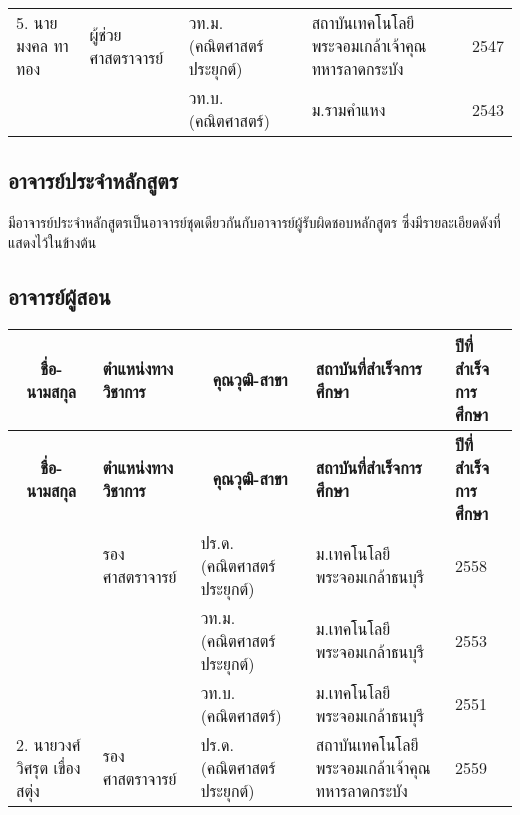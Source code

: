 {\begin{longtable}{|p{}|p{}|p{}|p{}|p{}|}
 \multirow{1}{*}{5. นายมงคล ทาทอง}  & ผู้ช่วยศาสตราจารย์ & วท.ม. (คณิตศาสตร์ประยุกต์) & สถาบันเทคโนโลยีพระจอมเกล้าเจ้าคุณทหารลาดกระบัง & 2547 \\ \cline{3-5} 
             &                   & วท.บ. (คณิตศาสตร์)         & ม.รามคำแหง                   & 2543                \\ \hline
             

\end{longtable}


\subsection*{อาจารย์ประจำหลักสูตร}

\printprogram{} มีอาจารย์ประจำหลักสูตรเป็นอาจารย์ชุดเดียวกันกับอาจารย์ผู้รับผิดชอบหลักสูตร ซึ่งมีรายละเอียดดังที่แสดงไว้ในข้างต้น
\newpage
\subsection*{อาจารย์ผู้สอน}
\begin{center}
	{\footnotesize     
		\begin{longtable}{|p{}|p{}|p{}|p{}|p{}|}
			\hline
			\multicolumn{1}{|c|}{\textbf{ชื่อ-นามสกุล}} & \textbf{ตำแหน่งทางวิชาการ} & \multicolumn{1}{c|}{\textbf{คุณวุฒิ-สาขา}}               & \textbf{สถาบันที่สำเร็จการศึกษา}               & \textbf{ปีที่สำเร็จการศึกษา} \\ \hline
			
			\endfirsthead
			\hline
		\multicolumn{1}{|c|}{\textbf{ชื่อ-นามสกุล}} & \textbf{ตำแหน่งทางวิชาการ} & \multicolumn{1}{c|}{\textbf{คุณวุฒิ-สาขา}}               & \textbf{สถาบันที่สำเร็จการศึกษา}               & \textbf{ปีที่สำเร็จการศึกษา} \\ \hline
				\endhead
				\hline
				\endfoot
			
		\multirow{1}{*}{1. นายพงศกร สุนทรายุทธ์}
				&รองศาสตราจารย์	&ปร.ด. (คณิตศาสตร์ประยุกต์) &ม.เทคโนโลยีพระจอมเกล้าธนบุรี&2558\\
				\cline{3-5}
				&&วท.ม. (คณิตศาสตร์ประยุกต์)&ม.เทคโนโลยีพระจอมเกล้าธนบุรี&2553\\
				\cline{3-5}
				&& วท.บ. (คณิตศาสตร์)&ม.เทคโนโลยีพระจอมเกล้าธนบุรี&2551\\
				\hline
		
		\multirow{1}{*}{2. นายวงศ์วิศรุต เขื่องสตุ่ง}
				&รองศาสตราจารย์&ปร.ด. (คณิตศาสตร์ประยุกต์)&สถาบันเทคโนโลยีพระจอมเกล้าเจ้าคุณทหารลาดกระบัง&2559\\
				\cline{3-5}
				

\end{longtable}}
\end{center}}
